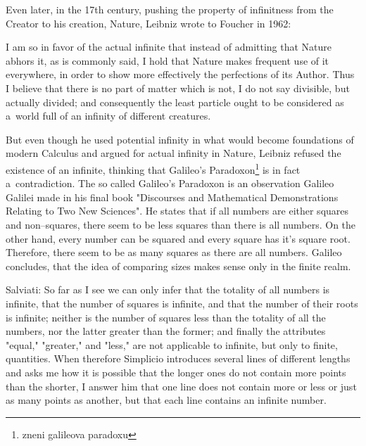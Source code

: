 Even later, in the 17th century, pushing the property of infinitness from the Creator to his creation, Nature, Leibniz wrote to Foucher in 1962:
\begin{displayquote}
I am so in favor of the actual infinite that instead of admitting that Nature abhors
it, as is commonly said, I hold that Nature makes frequent use of it everywhere,
in order to show more effectively the perfections of its Author. Thus I believe that
there is no part of matter which is not, I do not say divisible, but actually divided;
and consequently the least particle ought to be considered as a~world full of an
infinity of different creatures.
\end{displayquote}
But even though he used potential infinity in what would become foundations of modern Calculus and argued for actual infinity in Nature, Leibniz refused the existence of an infinite, thinking that Galileo's Paradoxon\footnote{zneni galileova paradoxu} is in fact a~contradiction. The so called Galileo's Paradoxon is an observation Galileo Galilei made in his final book "Discourses and Mathematical Demonstrations Relating to Two New Sciences".
He states that if all numbers are either squares and non–squares, there seem to be less squares than there is all numbers. On the other hand, every number can be squared and every square has it's square root. Therefore, there seem to be as many squares as there are all numbers. Galileo concludes, that the idea of comparing sizes makes sense only in the finite realm.
\begin{displayquote}
Salviati: So far as I see we can only infer that the totality of all numbers is infinite, that the number of squares is infinite, and that the number of their roots is infinite; neither is the number of squares less than the totality of all the numbers, nor the latter greater than the former; and finally the attributes "equal," "greater," and "less," are not applicable to infinite, but only to finite, quantities. When therefore Simplicio introduces several lines of different lengths and asks me how it is possible that the longer ones do not contain more points than the shorter, I answer him that one line does not contain more or less or just as many points as another, but that each line contains an infinite number.
\end{displayquote}
